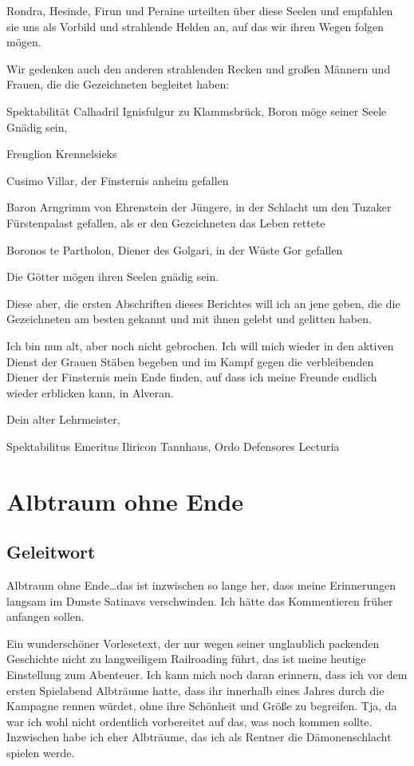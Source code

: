 Rondra, Hesinde, Firun und Peraine urteilten über diese Seelen und empfahlen sie uns als Vorbild und strahlende Helden an, auf das wir ihren Wegen folgen mögen.

Wir gedenken auch den anderen strahlenden Recken und großen Männern und Frauen, die die Gezeichneten begleitet haben:

Spektabilität Calhadril Ignisfulgur zu Klammsbrück, Boron möge seiner Seele Gnädig sein,\par\smallskip
Frenglion Krennelsieks\par\smallskip
Cusimo Villar, der Finsternis anheim gefallen\par\smallskip
Baron Arngrimm von Ehrenstein der Jüngere, in der Schlacht um den Tuzaker Fürstenpalast gefallen, als er den Gezeichneten das Leben rettete\par\smallskip
Boronos te Partholon, Diener des Golgari, in der Wüste Gor gefallen

Die Götter mögen ihren Seelen gnädig sein.

Diese aber, die ersten Abschriften dieses Berichtes will ich an jene geben, die die Gezeichneten am besten gekannt und mit ihnen gelebt und gelitten haben.

Ich bin nun alt, aber noch nicht gebrochen. Ich will mich wieder in den aktiven Dienst der Grauen Stäben begeben und im Kampf gegen die verbleibenden Diener der Finsternis mein Ende finden, auf dass ich meine Freunde endlich wieder erblicken kann, in Alveran.

Dein alter Lehrmeister,

Spektabilitus Emeritus Iliricon Tannhaus, Ordo Defensores Lecturia


\chapter{Albtraum ohne Ende}

\section{Geleitwort}

Albtraum ohne Ende\dots das ist inzwischen so lange her, dass meine Erinnerungen langsam im Dunste Satinavs verschwinden. Ich hätte das Kommentieren früher anfangen sollen.

Ein wunderschöner Vorlesetext, der nur wegen seiner unglaublich packenden Geschichte nicht zu langweiligem Railroading führt, das ist meine heutige Einstellung zum Abenteuer. Ich kann mich noch daran erinnern, dass ich vor dem ersten Spielabend Albträume hatte, dass ihr innerhalb eines Jahres durch die Kampagne rennen würdet, ohne ihre Schönheit und Größe zu begreifen. Tja, da war ich wohl nicht ordentlich vorbereitet auf das, was noch kommen sollte. Inzwischen habe ich eher Albträume, das ich als Rentner die Dämonenschlacht spielen werde.

